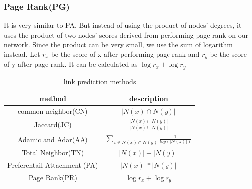 \documentclass[12pt]{article}
\begin{document}
\subsubsection{Page Rank(PG)}
It is very similar to PA. But instead of using the product of nodes' degrees, it uses the product of two nodes' scores derived from performing page rank on our network. Since the product can be very small, we use the sum of logarithm instead. Let $r_x$ be the score of x after performing page rank and $r_y$ be the score of y after page rank. It can be calculated as $\log{r_x} + \log{r_y}$
\begin{table}
	\begin{center}
		\begin{tabular}{|c|c|}
			\hline
			method & description \\
			\hline
			common neighbor(CN) & $|N(x) \cap N(y)|$ \\
			Jaccard(JC) & $\frac{|N(x) \cap N(y)|}{|N(x) \cup N(y)|}$ \\
			Adamic and Adar(AA) & $\sum_{z \in N(x) \cap N(y)}{\frac{1}{log(|N(z)|)}}$ \\
			Total Neighbor(TN) & $|N(x)| + |N(y)|$ \\
			Preferentail Attachment (PA) & $|N(x)| * |N(y)|$ \\
			Page Rank(PR)  & $\log{r_x} + \log{r_y}$ \\	
			\hline
		\end{tabular}
	\end{center}
	\caption{link prediction methods}
	\label{tab:method}
\end{table}
\end{document}
